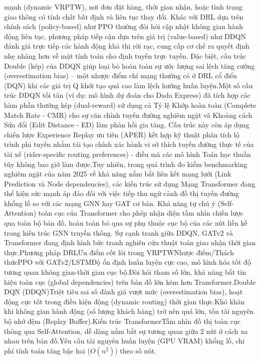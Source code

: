 \documentclass[13pt, a4paper]{extarticle} %
\begin{document}
mạnh (dynamic VRPTW), nơi đơn đặt hàng, thời gian nhận, hoặc tình trạng giao thông có tính chất bất định và liên tục thay đổi. Khác với DRL dựa trên chính sách (policy-based) như PPO thường đòi hỏi cập nhật không gian hành động liên tục, phương pháp tiếp cận dựa trên giá trị (value-based) như DDQN đánh giá trực tiếp các hành động khả thi rời rạc, cung cấp cơ chế ra quyết định nhẹ nhàng hơn về mặt tính toán cho định tuyến trực tuyến. Đặc biệt, cấu trúc Double (kép) của DDQN giúp loại bỏ hoàn toàn sự ước lượng sai lệch tăng cường (overestimation bias) – một nhược điểm chí mạng thường có ở DRL cổ điển (DQN) khi các giá trị Q khởi tạo quá cao làm lệch hướng huấn luyện.Một số cấu trúc DDQN tối tân (ví dụ: mô hình dự đoán cho Dada Express) đã tích hợp các hàm phần thưởng kép (dual-reward) sử dụng cả Tỷ lệ Khớp hoàn toàn (Complete Match Rate - CMR) cho sự căn chỉnh tuyến đường nghiêm ngặt và Khoảng cách Sửa đổi (Edit Distance - ED) làm phản hồi gia tăng. Cấu trúc này còn áp dụng chiến lược Experience Replay ưu tiên (APER) kết hợp kỹ thuật phân tích lộ trình phi tuyến nhằm tái tạo chính xác hành vi sở thích tuyến đường thực tế của tài xế (rider-specific routing preferences) - điều mà các mô hình Toán học thuần túy không bao giờ làm được.Tuy nhiên, trong quá trình đo kiểm benchmarking nghiêm ngặt của năm 2025 về khả năng nắm bắt liên kết mạng lưới (Link Prediction và Node dependencies), các kiến trúc sử dụng Mạng Transformer đang thể hiện sức mạnh áp đảo đối với việc tiếp thu ngữ cảnh đồ thị tuyến đường khổng lồ so với các mạng GNN hay GAT cơ bản. Khả năng tự chú ý (Self-Attention) toàn cục của Transformer cho phép nhận diện tầm nhìn chiến lược qua toàn bộ bản đồ, hoàn toàn bỏ qua sự phụ thuộc cục bộ của các nút liền kề trong kiến trúc GNN truyền thống. Sự cạnh tranh giữa DDQN, GATv2 và Transformer đang định hình bức tranh nghiên cứu thuật toán giao nhận thời gian thực.Phương pháp DRLƯu điểm cốt lõi trong VRPTWNhược điểm/Thách thứcPPO với GATv2/LSTMĐộ ổn định huấn luyện cực cao, mô hình hóa tốt độ tương quan không gian-thời gian cục bộ.Đòi hỏi tham số lớn, khả năng bắt tín hiệu toàn cục (global dependencies) trên bản đồ lớn kém hơn Transformer.Double DQN (DDQN)Triệt tiêu sai số đánh giá vượt mức (overestimation bias), hoạt động cực tốt trong điều kiện động (dynamic routing) thời gian thực.Khó khăn khi không gian hành động (số lượng khách hàng) trở nên quá lớn, tốn tài nguyên bộ nhớ đệm (Replay Buffer).Kiến trúc TransformerTầm nhìn đồ thị toàn cục thông qua Self-Attention, dễ dàng nắm bắt sự tương quan giữa 2 nút ở cách xa nhau trên bản đồ.Yêu cầu tài nguyên huấn luyện (GPU VRAM) khổng lồ, chi phí tính toán tăng bậc hai ($O(n^2)$) theo số nút.
\end{document}
